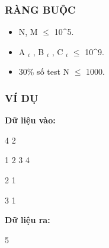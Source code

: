\subsubsection{   RÀNG BUỘC  }
\begin{itemize}
	\item     N, M  $\le$  10^5.   
	\item     A    $_     i    $    , B    $_     i    $    , C    $_     i    $     $\le$  10^9.   
	\item     30\% số test N  $\le$  1000.   
\end{itemize}

\subsubsection{   VÍ DỤ  }

\textbf{    Dữ liệu vào:   }

   4 2  

   1 2 3 4  

   2 1  

   3 1  

\textbf{    Dữ liệu ra:   }

   5  
